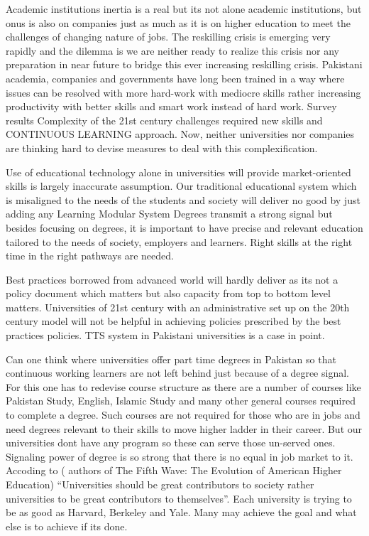 \documentclass[
  12pt]{article}
\begin{document}
Academic institutions inertia is a real but its not alone academic
institutions, but onus is also on companies just as much as it is on
higher education to meet the challenges of changing nature of jobs. The
reskilling crisis is emerging very rapidly and the dilemma is we are
neither ready to realize this crisis nor any preparation in near future
to bridge this ever increasing reskilling crisis. Pakistani academia,
companies and governments have long been trained in a way where issues
can be resolved with more hard-work with mediocre skills rather
increasing productivity with better skills and smart work instead of
hard work. Survey results Complexity of the 21st century challenges
required new skills and CONTINUOUS LEARNING approach. Now, neither
universities nor companies are thinking hard to devise measures to deal
with this complexification.

Use of educational technology alone in universities will provide
market-oriented skills is largely inaccurate assumption. Our traditional
educational system which is misaligned to the needs of the students and
society will deliver no good by just adding any Learning Modular System
Degrees transmit a strong signal but besides focusing on degrees, it is
important to have precise and relevant education tailored to the needs
of society, employers and learners. Right skills at the right time in
the right pathways are needed.

Best practices borrowed from advanced world will hardly deliver as its
not a policy document which matters but also capacity from top to bottom
level matters. Universities of 21st century with an administrative set
up on the 20th century model will not be helpful in achieving policies
prescribed by the best practices policies. TTS system in Pakistani
universities is a case in point.

Can one think where universities offer part time degrees in Pakistan so
that continuous working learners are not left behind just because of a
degree signal. For this one has to redevise course structure as there
are a number of courses like Pakistan Study, English, Islamic Study and
many other general courses required to complete a degree. Such courses
are not required for those who are in jobs and need degrees relevant to
their skills to move higher ladder in their career. But our universities
dont have any program so these can serve those un-served ones. Signaling
power of degree is so strong that there is no equal in job market to it.
Accoding to \citet{CrowDabars2020} ( authors of The Fifth Wave: The
Evolution of American Higher Education) ``Universities should be great
contributors to society rather universities to be great contributors to
themselves''. Each university is trying to be as good as Harvard,
Berkeley and Yale. Many may achieve the goal and what else is to achieve
if its done.
\end{document}
